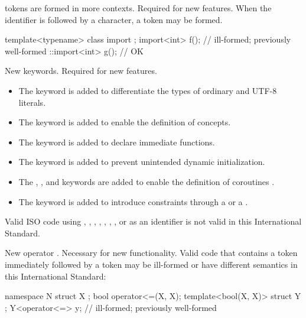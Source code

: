 \change
{} tokens are formed in more contexts.
\rationale
Required for new features.
\effect
When the identifier 
is followed by a \tcode{<} character,
a  token may be formed.
\begin{example}
\begin{codeblock}
template<typename> class import {};
import<int> f();                // ill-formed; previously well-formed
::import<int> g();              // OK
\end{codeblock}
\end{example}

\change
New keywords.
\rationale
Required for new features.
\begin{itemize}
\item
The  keyword is added to differentiate
the types of ordinary and UTF-8 literals.
\item
The  keyword is
added to enable the definition of concepts.
\item
The  keyword is added to
declare immediate functions.
\item
The  keyword is added to
prevent unintended dynamic initialization.
\item
The , , and  keywords are added
to enable the definition of coroutines .
\item
The  keyword is added
to introduce constraints through a 
or a .
\end{itemize}
\effectafteritemize
Valid ISO \CppXVII{} code using
,
,
,
,
, , ,
or 
as an identifier is not valid in this International Standard.

\change
New operator \tcode{<=>}.
\rationale
Necessary for new functionality.
\effect
Valid \CppXVII{} code that contains a \tcode{<=} token
immediately followed by a \tcode{>} token
may be ill-formed or have different semantics in this International Standard:
\begin{codeblock}
namespace N {
  struct X {};
  bool operator<=(X, X);
  template<bool(X, X)> struct Y {};
  Y<operator<=> y;              // ill-formed; previously well-formed
}
\end{codeblock}

